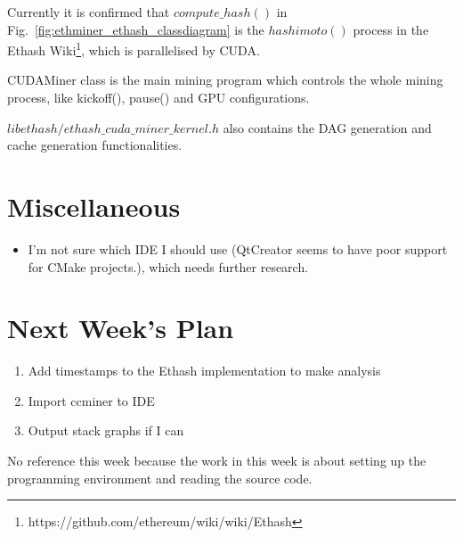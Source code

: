 \documentclass[11pt]{article}
\begin{document}
Currently it is confirmed that $compute\_hash()$ in Fig.~\ref{fig:ethminer_ethash_classdiagram} is the $hashimoto()$ process in the Ethash Wiki\footnote{https://github.com/ethereum/wiki/wiki/Ethash}, which is parallelised by CUDA.

CUDAMiner class is the main mining program which controls the whole mining process, like kickoff(), pause() and GPU configurations. 

$libethash/ethash\_cuda\_miner\_kernel.h$ also contains the DAG generation and cache generation functionalities.

\section{Miscellaneous}

\begin{itemize}
\item I'm not sure which IDE I should use (QtCreator seems to have poor support for CMake projects.), which needs further research.
\end{itemize}
%
%
\section{Next Week's Plan}
\begin{enumerate}
\item Add timestamps to the Ethash implementation to make analysis
\item Import ccminer to IDE
\item Output stack graphs if I can
\end{enumerate}

No reference this week because the work in this week is about setting up the programming environment and reading the source code.

%
%
\end{document}
